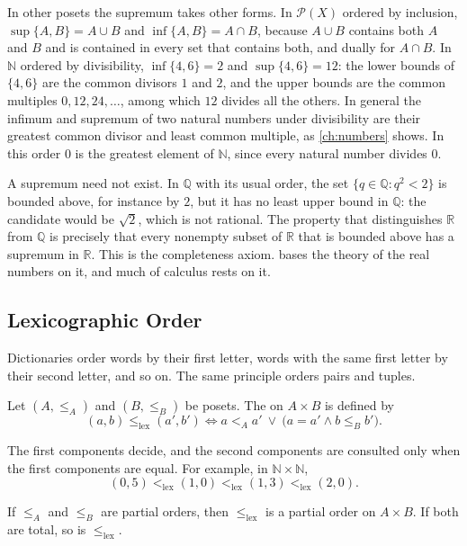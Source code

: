 In other posets the supremum takes other forms. In $\mathcal P(X)$ ordered by inclusion, $\sup\{A,B\}=A\cup B$ and $\inf\{A,B\}=A\cap B$, because $A\cup B$ contains both $A$ and $B$ and is contained in every set that contains both, and dually for $A\cap B$. In $\mathbb N$ ordered by divisibility, $\inf\{4,6\}=2$ and $\sup\{4,6\}=12$: the lower bounds of $\{4,6\}$ are the common divisors $1$ and $2$, and the upper bounds are the common multiples $0,12,24,\ldots$, among which $12$ divides all the others. In general the infimum and supremum of two natural numbers under divisibility are their greatest common divisor and least common multiple, as \cref{ch:numbers} shows. In this order $0$ is the greatest element of $\mathbb N$, since every natural number divides $0$.

A supremum need not exist. In $\mathbb Q$ with its usual order, the set $\{q\in\mathbb Q: q^2<2\}$ is bounded above, for instance by $2$, but it has no least upper bound in $\mathbb Q$: the candidate would be $\sqrt2$, which is not rational. The property that distinguishes $\mathbb R$ from $\mathbb Q$ is precisely that every nonempty subset of $\mathbb R$ that is bounded above has a supremum in $\mathbb R$. This is the completeness axiom.  bases the theory of the real numbers on it, and much of calculus rests on it.

\subsection{Lexicographic Order}

Dictionaries order words by their first letter, words with the same first letter by their second letter, and so on. The same principle orders pairs and tuples.

\begin{definition}
\label{def:lex}
Let $(A,\le_A)$ and $(B,\le_B)$ be posets. The  on $A\times B$ is defined by
\[
(a,b)\le_{\mathrm{lex}}(a',b')\iff a<_Aa'\ \vee\ \bigl(a=a'\wedge b\le_Bb'\bigr).
\]
\end{definition}

The first components decide, and the second components are consulted only when the first components are equal. For example, in $\mathbb N\times\mathbb N$,
\[
(0,5)<_{\mathrm{lex}}(1,0)<_{\mathrm{lex}}(1,3)<_{\mathrm{lex}}(2,0).
\]

\begin{proposition}
\label{prop:lex}
If $\le_A$ and $\le_B$ are partial orders, then $\le_{\mathrm{lex}}$ is a partial order on $A\times B$. If both are total, so is $\le_{\mathrm{lex}}$.
\end{proposition}

